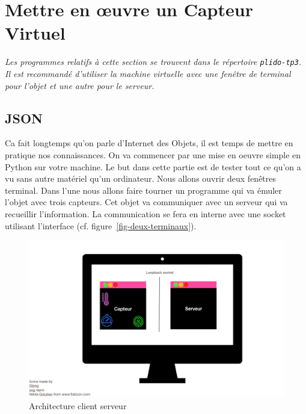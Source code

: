 \cleardoublepage

\chapter{Mettre en œuvre un Capteur Virtuel}

\textit{Les programmes relatifs à cette section se trouvent dans le répertoire \texttt{plido-tp3}. Il est recommandé d'utiliser la machine virtuelle avec une fenêtre de terminal pour l'objet et une autre pour le serveur.}

\section {JSON}

\begin{figure}
\end{figure}

Ca fait longtemps qu'on parle d'Internet des Objets, il est temps de mettre en pratique nos connaissances. On va commencer par une mise en oeuvre simple en Python sur votre machine. Le but dans cette partie est de tester tout ce qu'on a vu sans autre matériel qu'un ordinateur. Nous allons ouvrir deux fenêtres terminal. Dans l'une nous allons faire tourner un programme qui va émuler l'objet avec trois capteurs. Cet objet va communiquer avec un serveur qui va recueillir l'information. La communication se fera en interne avec une socket utilisant l'interface  (cf. figure~\vref{fig-deux-terminaux}).


\begin{figure}[tbp]
\centerline{\includegraphics[width=1\columnwidth]{Pictures/Capture24.png}}
\caption{Architecture client serveur}
\label{fig-deux-terminaux}
\end{figure}

